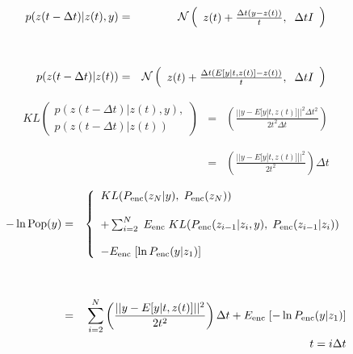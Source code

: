 {
{\huge
\begin{eqnarray*}
  p(z(t - \Delta t)|z(t),y) & = & {\cal N}\left(\begin{array}{l}z(t) + \frac{\Delta t(y - z(t))}{t},\;\; \Delta t I\end{array}\right) \\
  \\
  \\
  p(z(t - \Delta t)|z(t)) & = & {\cal N}\left(\begin{array}{l} z(t) + \frac{\Delta t(E[y|t,z(t)] - z(t))}{t}, \;\; \Delta t I\end{array}\right)
\end{eqnarray*}

\vfill
\begin{eqnarray*}
  KL\left(\begin{array}{l}p(z(t-\Delta t)|z(t),y), \\p(z(t-\Delta  t)|z(t))\end{array}\right)
  & = & \left(\frac{||y-E[y|t,z(t)]||^2\Delta t^2}{2t^2\Delta t}\right) \\
  \\
  \\
  & =  & \left(\frac{||y-E[y|t,z(t)]||^2}{2t^2}\right) \Delta t
\end{eqnarray*}
}

\begin{eqnarray*}
  - \ln \mathrm{Pop}(y) & = & \left\{\begin{array}{l} KL(P_{\mathrm{enc}}(z_N|y),\;P_{\mathrm{enc}}(z_N)) \\ \\ + \sum_{i=2}^N  \; E_{\mathrm{enc}}\; KL(P_{\mathrm{enc}}(z_{i-1}|z_i,y),\;P_{\mathrm{enc}}(z_{i-1}|z_i)) \\ \\ - E_{\mathrm{enc}}\;[\ln P_{\mathrm{enc}}(y|z_1)] \end{array}\right. \\
  \\
  \\
  & = & \sum_{i = 2}^N  \left(\frac{||y-E[y|t,z(t)]||^2}{2t^2}\right) \Delta t + E_{\mathrm{enc}}\;[- \ln P_{\mathrm{enc}}(y|z_1)] \\
  & & \;\;\;\;\;\;\;\;\;\;\;\;\;\;\;\;\;t = i\Delta t
\end{eqnarray*}


}
